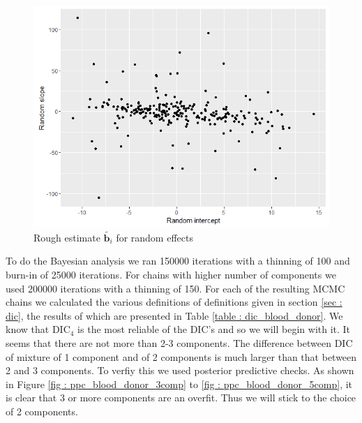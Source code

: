 \begin{figure}
	\centering
	\includegraphics[scale=0.5]{mainmatter/chapter_6_blood_donor/rough_estimate_random_effects.png}
	\caption{Rough estimate $\tilde{\boldsymbol{b}_i}$ for random effects}
	\label{fig : rough_idea_blood_donor}
\end{figure}

To do the Bayesian analysis we ran 150000 iterations with a thinning of 100 and burn-in of 25000 iterations. For chains with higher number of components we used 200000 iterations with a thinning of 150. For each of the resulting MCMC chains we calculated the various definitions of definitions given in section \ref{sec : dic}, the results of which are presented in Table \ref{table : dic_blood_donor}. We know that $\text{DIC}_4$ is the most reliable of the DIC's and so we will begin with it. It seems that there are not more than 2-3 components. The difference between DIC of mixture of 1 component and of 2 components is much larger than that between 2 and 3 components. To verfiy this we used posterior predictive checks. As shown in Figure \ref{fig : ppc_blood_donor_3comp} to \ref{fig : ppc_blood_donor_5comp}, it is clear that 3 or more components are an overfit. Thus we will stick to the choice of 2 components.\\

